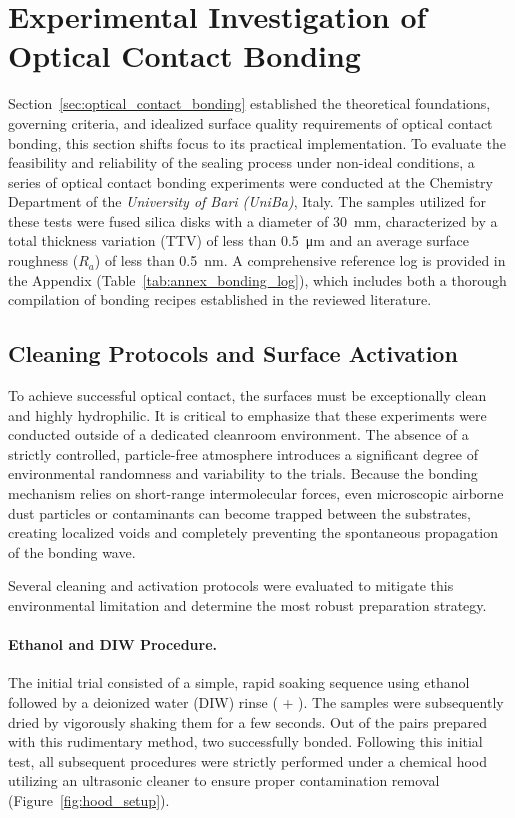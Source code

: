 \FloatBarrier
\section{Experimental Investigation of Optical Contact Bonding}
\label{sec:optexp}
Section~\ref{sec:optical_contact_bonding} established the theoretical foundations, 
governing criteria, and idealized surface quality requirements of optical contact bonding, this 
section shifts focus to its practical implementation. To evaluate the feasibility and reliability of
the sealing process under non-ideal conditions, a series of optical
contact bonding experiments were conducted at the Chemistry Department of
the \textit{University of Bari (UniBa)}, Italy. The samples utilized for these tests
were fused silica disks with a diameter of \SI{30}{\milli\meter},
characterized by a total thickness variation (TTV) of less than
\SI{0.5}{\micro\meter} and an average surface roughness ($R_a$) of less
than \SI{0.5}{\nano\meter}. A comprehensive reference log is provided in the
Appendix (Table~\ref{tab:annex_bonding_log}), which includes both a thorough
compilation of bonding recipes established in the reviewed literature.

\subsection{Cleaning Protocols and Surface Activation}
To achieve successful optical contact, the surfaces must be exceptionally
clean and highly hydrophilic. It is critical to emphasize that these
experiments were conducted outside of a dedicated cleanroom environment.
The absence of a strictly controlled, particle-free atmosphere introduces
a significant degree of environmental randomness and variability to the
trials. Because the bonding mechanism relies on short-range intermolecular
forces, even microscopic airborne dust particles or contaminants can become
trapped between the substrates, creating localized voids and completely
preventing the spontaneous propagation of the bonding wave.

Several cleaning and activation protocols were evaluated to mitigate this
environmental limitation and determine the most robust preparation strategy.

\paragraph{Ethanol and DIW Procedure.}
The initial trial consisted of a simple, rapid soaking sequence using
ethanol followed by a deionized water (DIW) rinse ( + ).
The samples were subsequently dried by vigorously shaking them for a few
seconds. Out of the pairs prepared with this rudimentary method, two
successfully bonded. Following this initial test, all subsequent procedures
were strictly performed under a chemical hood utilizing an ultrasonic cleaner
to ensure proper contamination removal (Figure~\ref{fig:hood_setup}).

